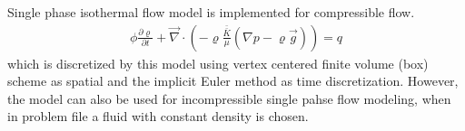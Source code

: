Single phase isothermal flow model is implemented for compressible flow. \begin{align*} \phi \frac{\partial \varrho}{\partial t} + \vec{\nabla} \cdot (- \varrho \frac{\bar{\bar{K}}}{\mu} ( \nabla p -\varrho \vec{g})) = q \end{align*} which is discretized by this model using vertex centered finite volume (box) scheme as spatial and the implicit Euler method as time discretization. However, the model can also be used for incompressible single pahse flow modeling, when in problem file a fluid with constant density is chosen. 
